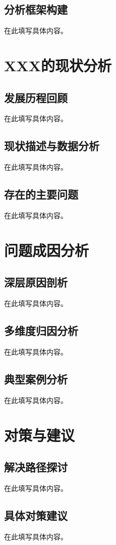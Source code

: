 \documentclass[a4paper,12pt,oneside]{ctexart}
\begin{document}
\subsection{分析框架构建}
在此填写具体内容。


\section{XXX的现状分析}
\subsection{发展历程回顾}
在此填写具体内容。

\subsection{现状描述与数据分析}
在此填写具体内容。

\subsection{存在的主要问题}
在此填写具体内容。


\section{问题成因分析}
\subsection{深层原因剖析}
在此填写具体内容。

\subsection{多维度归因分析}
在此填写具体内容。

\subsection{典型案例分析}
在此填写具体内容。


\section{对策与建议}
\subsection{解决路径探讨}
在此填写具体内容。

\subsection{具体对策建议}
在此填写具体内容。
\end{document}
